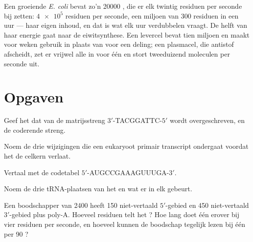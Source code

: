 \begin{example}\label{ex:b1:gene-expression:numbers}
Een groeiende \emph{E. coli} bevat zo'n \num{20000} , die er elk twintig
residuen per seconde bij zetten: $\num{4e5}$ residuen per seconde, een miljoen
 van \qty{300}{} residuen in een uur --- haar eigen inhoud, en dat is wat
elk uur verdubbelen vraagt. De helft van haar energie gaat naar de eiwitsynthese.
Een levercel bevat tien miljoen  en maakt  voor weken gebruik in
plaats van voor een deling; een plasmacel, die antistof afscheidt, zet er vrijwel
alle in voor één  en stort tweeduizend moleculen per seconde uit.
\end{example}

\section{Opgaven}

\begin{exercise}[$\star$]\label{exo:b1:gene-expression:1}
Geef het  dat van de matrijsstreng $3'$-TACGGATTC-$5'$ wordt overgeschreven, en
de coderende streng.
\end{exercise}

\begin{exercise}[$\star$]\label{exo:b1:gene-expression:2}
Noem de drie wijzigingen die een eukaryoot primair transcript ondergaat voordat het
de celkern verlaat.
\end{exercise}

\begin{exercise}[$\star$]\label{exo:b1:gene-expression:3}
Vertaal met de codetabel $5'$-AUGCCGAAAGUUUGA-$3'$.
\end{exercise}

\begin{exercise}[$\star$]\label{exo:b1:gene-expression:4}
Noem de drie tRNA-plaatsen van het  en wat er in elk gebeurt.
\end{exercise}

\begin{exercise}[$\star\star$]\label{exo:b1:gene-expression:5}
Een boodschapper van \qty{2400}{}  heeft \qty{150}{} 
niet-vertaald $5'$-gebied en \qty{450}{} niet-vertaald $3'$-gebied plus poly-A.
Hoeveel residuen telt het ? Hoe lang doet één  erover bij vier
residuen per seconde, en hoeveel  kunnen de boodschap tegelijk lezen bij
één per \qty{90}{} ?
\end{exercise}

